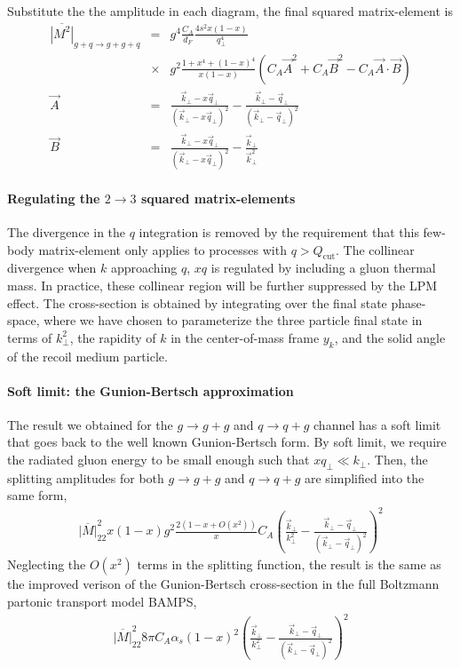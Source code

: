 Substitute the the amplitude in each diagram, the final squared matrix-element is 
\begin{eqnarray}
\overline{|M^2|}_{g+q\rightarrow g+g+q} &=&
g^4 \frac{C_A}{d_F}\frac{4s^2x(1-x)}{q_\perp^4} \\\nonumber
&\times&g^2\frac{1+x^4+(1-x)^4}{x(1-x)}   
\left(C_A\vec{A}^2 + C_A\vec{B}^2 - C_A\vec{A}\cdot\vec{B}\right)\\
\vec{A} &=& \frac{\vec{k}_\perp - x\vec{q}_\perp}{(\vec{k}_\perp - x\vec{q}_\perp)^2} -  \frac{\vec{k}_\perp - \vec{q}_\perp}{(\vec{k}_\perp - \vec{q}_\perp)^2} \\
\vec{B} &=& \frac{\vec{k}_\perp - x\vec{q}_\perp}{(\vec{k}_\perp - x\vec{q}_\perp)^2} -  \frac{\vec{k}_\perp}{\vec{k}_\perp^2}
\end{eqnarray}

\paragraph*{Regulating the $2\rightarrow 3$ squared matrix-elements}
The divergence in the $q$ integration is removed by the requirement that this few-body matrix-element only applies to processes with $q>Q_{\textrm{cut}}$.
The collinear divergence when $k$ approaching $q$, $xq$ is regulated by including a gluon thermal mass. 
In practice, these collinear region will be further suppressed by the LPM effect.
The cross-section is obtained by integrating over the final state phase-space, where we have chosen to parameterize the three particle final state in terms of $k_\perp^2$, the rapidity of $k$ in the center-of-mass frame $y_k$, and the solid angle of the recoil medium particle.

\paragraph*{Soft limit: the Gunion-Bertsch approximation}
The result we obtained for the $g\rightarrow g+g$ and $q\rightarrow q+g$ channel has a soft limit that goes back to the well known Gunion-Bertsch form. 
By soft limit, we require the radiated gluon energy to be small enough such that $xq_\perp \ll k_\perp$.
Then, the splitting amplitudes for both $g\rightarrow g+g$ and  $q\rightarrow q+g$ are simplified into the same form,
\begin{eqnarray}
\overline{|M|}^2_{22} x(1-x)g^2 \frac{2(1-x+O(x^2))}{x} C_A \left(\frac{\vec{k}_\perp}{k_\perp^2}-\frac{\vec{k}_\perp-\vec{q}_\perp}{(\vec{k}_\perp-\vec{q}_\perp)^2}\right)^2
\end{eqnarray}
Neglecting the $O(x^2)$ terms in the splitting function, the result is the same as the improved verison of the Gunion-Bertsch cross-section in the full Boltzmann partonic transport model BAMPS,
\begin{eqnarray}
\overline{|M|}^2_{22} 8\pi C_A\alpha_s (1-x)^2 \left(\frac{\vec{k}_\perp}{k_\perp^2}-\frac{\vec{k}_\perp-\vec{q}_\perp}{(\vec{k}_\perp-\vec{q}_\perp)^2}\right)^2
\end{eqnarray}

